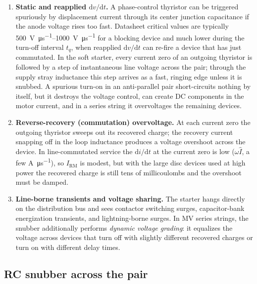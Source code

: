 \documentclass[11pt,a4paper]{article}
\begin{document}
\begin{enumerate}
  \item \textbf{Static and reapplied $\mathrm{d}v/\mathrm{d}t$.} A
        phase-control thyristor can be triggered spuriously by displacement
        current through its center junction capacitance if the anode voltage
        rises too fast. Datasheet critical values are typically
        \SIrange{500}{1000}{\volt\per\micro\second} for a blocking device
        and much lower during the turn-off interval $t_q$, when reapplied
        $\mathrm{d}v/\mathrm{d}t$ can re-fire a device that has just
        commutated. In the soft starter, every current zero of an outgoing
        thyristor is followed by a step of instantaneous line voltage across
        the pair; through the supply stray inductance this step arrives as a
        fast, ringing edge unless it is snubbed. A spurious turn-on in an
        anti-parallel pair short-circuits nothing by itself, but it destroys
        the voltage control, can create DC components in the motor current,
        and in a series string it overvoltages the remaining devices.
  \item \textbf{Reverse-recovery (commutation) overvoltage.} At each current
        zero the outgoing thyristor sweeps out its recovered charge; the
        recovery current snapping off in the loop inductance produces a
        voltage overshoot across the device. In line-commutated service the
        $\mathrm{d}i/\mathrm{d}t$ at the current zero is low
        ($\omega \hat{I}$, a few \si{\ampere\per\micro\second}), so
        $I_\mathrm{RM}$ is modest, but with the large disc devices used at
        high power the recovered charge is still tens of millicoulombs and
        the overshoot must be damped.
  \item \textbf{Line-borne transients and voltage sharing.} The starter
        hangs directly on the distribution bus and sees contactor switching
        surges, capacitor-bank energization transients, and lightning-borne
        surges. In MV series strings, the snubber additionally performs
        \emph{dynamic voltage grading}: it equalizes the voltage across
        devices that turn off with slightly different recovered charges or
        turn on with different delay times.
\end{enumerate}

\subsection{RC snubber across the pair}
\end{document}
